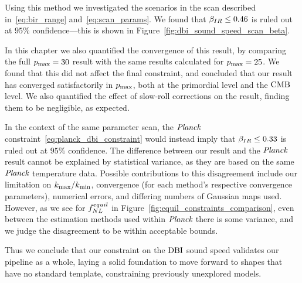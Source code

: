     Using this method we investigated the scenarios in the scan described in~\eqref{eq:bir_range}
    and~\eqref{eq:scan_params}. We found that $\beta_{IR}\le0.46$ is ruled out at $95\%$ confidence---this
    is shown in Figure~\ref{fig:dbi_sound_speed_scan_beta}.


    In this chapter we also quantified the convergence of this result, by comparing the full $p_\text{max}=30$
    result with the same results calculated for $p_\text{max}=25$. We found that this did not affect the
    final constraint, and concluded that our result has converged satisfactorily in $p_\text{max}$,
    both at the primordial level and the $\text{CMB}$ level.
    We also quantified the effect of slow-roll corrections on the result,
    finding them to be negligible, as expected.


    In the context of the same parameter scan,
    the $\textit{Planck}$ constraint~\eqref{eq:planck_dbi_constraint}
    would instead imply that $\beta_{IR}\le0.33$ is ruled out at $95\%$ confidence.
    The difference between our result and the $\textit{Planck}$ result cannot be explained by
    statistical variance, as they are based on the same $\textit{Planck}$ temperature data.
    Possible contributions to this disagreement include
    our limitation on ${k_\text{max}}/{k_\text{min}}$,
    convergence (for each method's respective convergence parameters),
    numerical errors, and differing numbers of Gaussian maps used.
    However, as we see for $f^{equil}_{NL}$ in Figure~\ref{fig:equil_constraints_comparison},
    even between the estimation methods used within $\textit{Planck}$ there is some variance,
    and we judge the disagreement to be within acceptable bounds.


    Thus we conclude that our constraint on the $\text{DBI}$ sound speed validates our pipeline as a whole,
    laying a solid foundation to move forward to shapes that have no standard template,
    constraining previously unexplored models.


